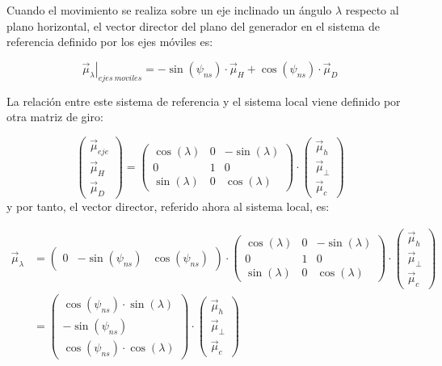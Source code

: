 Cuando el movimiento se realiza sobre un eje inclinado un ángulo $\lambda$
respecto al plano horizontal, el vector director del plano del generador
en el sistema de referencia definido por los ejes móviles es:

\begin{equation}
\left.\vec{\mu}_{\lambda}\right|_{ejes\ moviles}=-\sin(\psi_{ns})\cdot\vec{\mu}_{H}+\cos(\psi_{ns})\cdot\vec{\mu}_{D}\end{equation}

La relación entre este sistema de referencia y el sistema local viene
definido por otra matriz de giro:

\begin{equation}
\left(\begin{array}{c}
\vec{\mu}_{eje}\\
\vec{\mu}_{H}\\
\vec{\mu}_{D}\end{array}\right)=\left(\begin{array}{ccc}
\cos(\lambda) & 0 & -\sin(\lambda)\\
0 & 1 & 0\\
\sin(\lambda) & 0 & \cos(\lambda)\end{array}\right)\cdot\left(\begin{array}{c}
\vec{\mu}_{h}\\
\vec{\mu}_{\bot}\\
\vec{\mu}_{c}\end{array}\right)\label{MatrizGiroPolar}\end{equation}
y por tanto, el vector director, referido ahora al sistema local,
es:

\begin{align}
\vec{\mu}_{\lambda} & =\left(\begin{array}{ccc}
0 & -\sin(\psi_{ns}) & \cos(\psi_{ns})\end{array}\right)\cdot\left(\begin{array}{ccc}
\cos(\lambda) & 0 & -\sin(\lambda)\\
0 & 1 & 0\\
\sin(\lambda) & 0 & \cos(\lambda)\end{array}\right)\cdot\left(\begin{array}{c}
\vec{\mu}_{h}\\
\vec{\mu}_{\bot}\\
\vec{\mu}_{c}\end{array}\right)\label{Vector Polar}\\
 & =\left(\begin{array}{c}
\cos(\psi_{ns})\cdot\sin(\lambda)\\
-\sin(\psi_{ns})\\
\cos(\psi_{ns})\cdot\cos(\lambda)\end{array}\right)\cdot\left(\begin{array}{c}
\vec{\mu}_{h}\\
\vec{\mu}_{\bot}\\
\vec{\mu}_{c}\end{array}\right)\nonumber \end{align}


